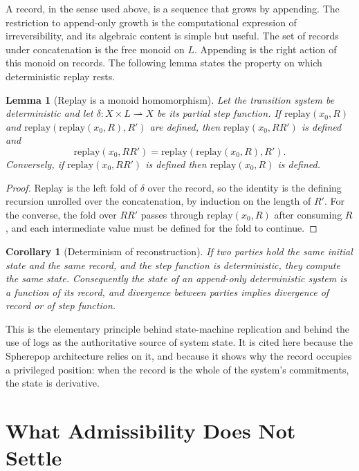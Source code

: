 \documentclass[11pt,twoside,openright]{book}
\theoremstyle{plain}
\newtheorem{lemma}[theorem]{Lemma}
\newtheorem{corollary}[theorem]{Corollary}
\theoremstyle{definition}
\theoremstyle{remark}
\newcommand{\replay}{\mathrm{replay}}
\begin{document}
A record, in the sense used above, is a sequence that grows by appending. The restriction to append-only growth is the computational expression of irreversibility, and its algebraic content is simple but useful. The set of records under concatenation is the free monoid on $L$. Appending is the right action of this monoid on records. The following lemma states the property on which deterministic replay rests.

\begin{lemma}[Replay is a monoid homomorphism]\label{lem:replay}
Let the transition system be deterministic and let $\delta:X\times L\rightharpoonup X$ be its partial step function. If $\replay(x_0,R)$ and $\replay(\replay(x_0,R),R')$ are defined, then $\replay(x_0,RR')$ is defined and
\[
\replay(x_0,RR')=\replay(\replay(x_0,R),R').
\]
Conversely, if $\replay(x_0,RR')$ is defined then $\replay(x_0,R)$ is defined.
\end{lemma}

\begin{proof}
Replay is the left fold of $\delta$ over the record, so the identity is the defining recursion unrolled over the concatenation, by induction on the length of $R'$. For the converse, the fold over $RR'$ passes through $\replay(x_0,R)$ after consuming $R$, and each intermediate value must be defined for the fold to continue.
\end{proof}

\begin{corollary}[Determinism of reconstruction]\label{cor:determinism}
If two parties hold the same initial state and the same record, and the step function is deterministic, they compute the same state. Consequently the state of an append-only deterministic system is a function of its record, and divergence between parties implies divergence of record or of step function.
\end{corollary}

This is the elementary principle behind state-machine replication \cite{schneider1990} and behind the use of logs as the authoritative source of system state. It is cited here because the Spherepop architecture relies on it, and because it shows why the record occupies a privileged position: when the record is the whole of the system's commitments, the state is derivative.

\section{What Admissibility Does Not Settle}
\end{document}
